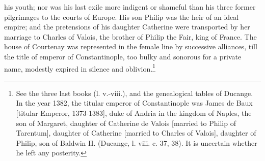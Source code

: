 his youth; nor was his last exile more indigent or shameful than his three former pilgrimages to the courts of Europe. His son Philip was the heir of an ideal empire; and the pretensions of his daughter Catherine were transported by her marriage to Charles of Valois, the brother of Philip the Fair, king of France. The house of Courtenay was represented in the female line by successive alliances, till the title of emperor of Constantinople, too bulky and sonorous for a private name, modestly expired in silence and oblivion.\footnote{See the three last books (l. v.-viii.), and the genealogical tables of Ducange. In the year 1382, the titular emperor of Constantinople was James de Baux [titular Emperor, 1373-1383], duke of Andria in the kingdom of Naples, the son of Margaret, daughter of Catherine de Valois [married to Philip of Tarentum], daughter of Catherine [married to Charles of Valois], daughter of Philip, son of Baldwin II. (Ducange, l. viii. c. 37, 38). It is uncertain whether he left any posterity.}

